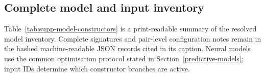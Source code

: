 

\subsection*{Complete model and input inventory}


Table~\ref{tab:supp-model-constructors} is a print-readable summary of the
resolved model inventory. Complete signatures and pair-level configuration
notes remain in the hashed machine-readable JSON records cited in its caption.
Neural models use the common optimisation protocol stated in
Section~\ref{predictive-models}; input IDs determine which constructor branches
are active.


